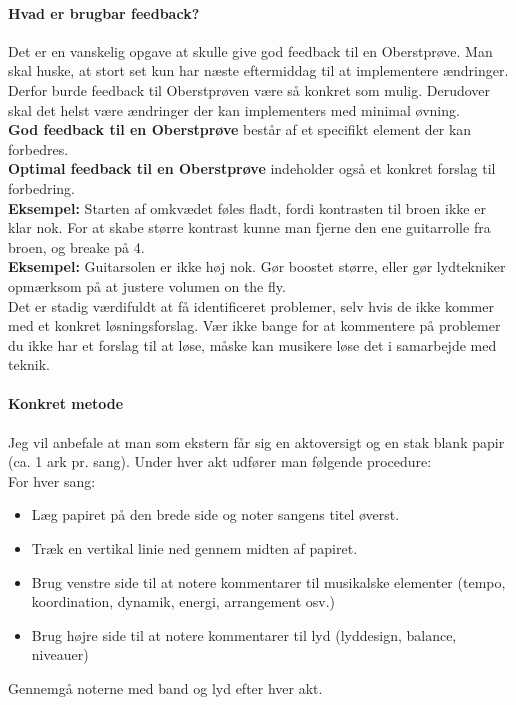 \paragraph{Hvad er brugbar feedback?}
Det er en vanskelig opgave at skulle give god feedback til en Oberstprøve. Man skal huske, at stort set kun har næste eftermiddag til at implementere ændringer.
Derfor burde feedback til Oberstprøven være så konkret som mulig.
Derudover skal det helst være ændringer der kan implementers med minimal øvning.\\
\textbf{God feedback til en Oberstprøve} består af et specifikt element der kan forbedres.\\
\textbf{Optimal feedback til en Oberstprøve} indeholder også et konkret forslag til forbedring.\\
\textbf{Eksempel:} Starten af omkvædet føles fladt, fordi kontrasten til broen ikke er klar nok.
For at skabe større kontrast kunne man fjerne den ene guitarrolle fra broen, og breake på 4.\\
\textbf{Eksempel:} Guitarsolen er ikke høj nok. Gør boostet større, eller gør lydtekniker opmærksom på at justere volumen on the fly.\\
Det er stadig værdifuldt at få identificeret problemer, selv hvis de ikke kommer med et konkret løsningsforslag. Vær ikke bange for at kommentere på problemer du ikke har et forslag til at løse, måske kan musikere løse det i samarbejde med teknik.

\paragraph{Konkret metode}
Jeg vil anbefale at man som ekstern får sig en aktoversigt og en stak blank papir (ca. 1 ark pr. sang). Under hver akt udfører man følgende procedure:\\
For hver sang:
\begin{itemize}
    \item Læg papiret på den brede side og noter sangens titel øverst.
    \item Træk en vertikal linie ned gennem midten af papiret.
    \item Brug venstre side til at notere kommentarer til musikalske elementer (tempo, koordination, dynamik, energi, arrangement osv.)
    \item Brug højre side til at notere kommentarer til lyd (lyddesign, balance, niveauer)
\end{itemize}
Gennemgå noterne med band og lyd efter hver akt.

